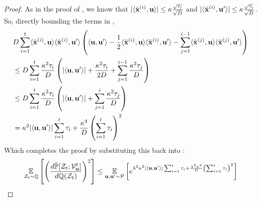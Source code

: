 \begin{proof}
    As in the proof of , we know that \(|\langle \tilde{\boldsymbol{\mathrm{x}}}^{(i)},\boldsymbol{\mathrm{u}}\rangle|\leq\kappa\frac{\sqrt{\tau_i}}{\sqrt{D}}\) and \(|\langle \tilde{\boldsymbol{\mathrm{x}}}^{(i)},\boldsymbol{\mathrm{u}}'\rangle|\leq\kappa\frac{\sqrt{\tau_i}}{\sqrt{D}}\).
    So, directly bounding the terms in ,
    \begin{align*}
        &D\sum_{i=1}^t
        \langle\tilde{\boldsymbol{\mathrm{x}}}^{(i)},\boldsymbol{\mathrm{u}}\rangle
        \langle\tilde{\boldsymbol{\mathrm{x}}}^{(i)},\boldsymbol{\mathrm{u}}'\rangle
        \left(
            \langle\boldsymbol{\mathrm{u}},\boldsymbol{\mathrm{u}}'\rangle
            -
            \frac12
            \langle\tilde{\boldsymbol{\mathrm{x}}}^{(i)},\boldsymbol{\mathrm{u}}\rangle
            \langle\tilde{\boldsymbol{\mathrm{x}}}^{(i)},\boldsymbol{\mathrm{u}}'\rangle
            -
            \sum_{j=1}^{i-1}
            \langle\tilde{\boldsymbol{\mathrm{x}}}^{(j)},\boldsymbol{\mathrm{u}}\rangle
            \langle\tilde{\boldsymbol{\mathrm{x}}}^{(j)},\boldsymbol{\mathrm{u}}'\rangle
        \right) \\
        &\leq
        D\sum_{i=1}^t
        \frac{\kappa^2 \tau_i}{D}
        \left(
            |\langle\boldsymbol{\mathrm{u}},\boldsymbol{\mathrm{u}}'\rangle|
            +
            \frac{\kappa^2 \tau_i}{2D}
            +
            \sum_{j=1}^{i-1}
            \frac{\kappa^2 \tau_j}{D}
        \right) \\
        &\leq
        D\sum_{i=1}^t
        \frac{\kappa^2 \tau_i}{D}
        \left(
            |\langle\boldsymbol{\mathrm{u}},\boldsymbol{\mathrm{u}}'\rangle|
            +
            \sum_{j=1}^{i}
            \frac{\kappa^2 \tau_j}{D}
        \right) \\
        &= \kappa^2 |\langle\boldsymbol{\mathrm{u}},\boldsymbol{\mathrm{u}}'\rangle| \sum_{i=1}^t \tau_i 
        + \frac{\kappa^4}{D} \left(\sum_{i=1}^t \tau_i\right)^2
    \end{align*}
Which completes the proof by substituting this back into :
\[
    \operatorname*{\mathbb{E}}_{{\mathcal Z}_t\sim{\mathbb Q}} \left[ \left( \frac{d\bar{{\mathbb P}}[{\mathcal Z}_t;{\mathcal V}_{\boldsymbol{\mathrm{u}}}^t]}{d{\mathbb Q}({\mathcal Z}_t)} \right)^2 \right]
    \leq 
    \operatorname*{\mathbb{E}}_{\boldsymbol{\mathrm{u}},\boldsymbol{\mathrm{u}}'\sim{\mathcal P}}\left[
        e^{\lambda^2 \kappa^2 |\langle\boldsymbol{\mathrm{u}},\boldsymbol{\mathrm{u}}'\rangle| \sum_{i=1}^t \tau_i 
        + \frac{\lambda^2 \kappa^4}{D} \left(\sum_{i=1}^t \tau_i\right)^2}\right]
\]
\end{proof}

